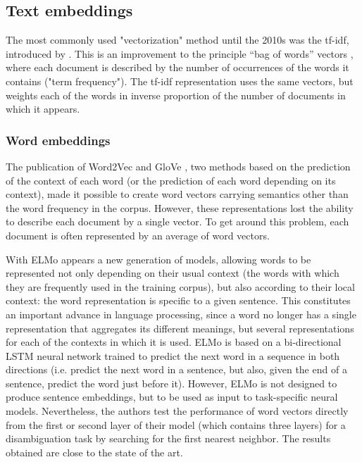 \subsection{Text embeddings}
\label{Text embeddings}
The most commonly used "vectorization" method until the 2010s
was the tf-idf, introduced by \citet{sparck_1972_statistical}. This is an improvement to the principle “bag of words” vectors \cite{harris1954distributional}, where each document is described by the
number of occurrences of the words it contains ("term frequency"). The tf-idf representation uses the same vectors, but weights each of the words in inverse proportion of the number of documents in which it appears.

\subsubsection{Word embeddings}

The publication of Word2Vec \citep{mikolov_efficient_2013} and GloVe \citep{pennington2014glove}, two methods based on the prediction of the context of each word (or the prediction of each word depending on its context), made it possible to create word vectors carrying semantics other than the word frequency in the corpus. However, these representations lost the ability to describe each document by a single vector. To get around this problem, each document is often represented by an average of word vectors.

With ELMo \citep{peters2018deep} appears a new generation of models,
allowing words to be represented not only depending on their usual context (the words with which they are frequently used in the training corpus), but also according to their local context: the word representation is specific to a given sentence. This constitutes an important advance in language processing, since a word no longer has a single representation that aggregates its different meanings, but several representations for each of the contexts in which it is used. ELMo is based on a bi-directional LSTM neural network trained to predict the next word in a sequence in both directions (i.e. predict the next word in a sentence, but also, given the end of a sentence, predict the word just before it). However, ELMo is not designed to produce sentence embeddings, but to be used as input to task-specific neural models. Nevertheless, the authors test the performance of word vectors directly from the first or second layer of their model (which contains three layers) for a disambiguation task by searching for the first nearest neighbor. The results obtained are close to the state of the art.

